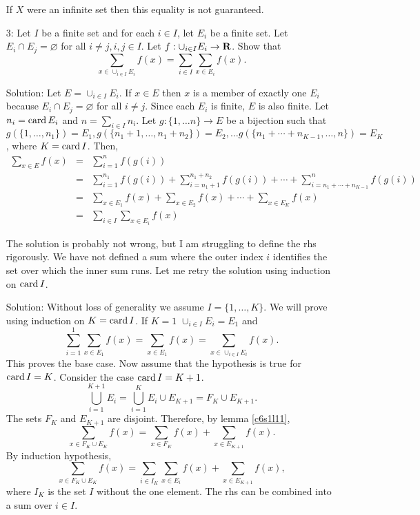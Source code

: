 \begin{enumerate}
\begin{rem}
If $X$ were an infinite set then this equality is not guaranteed.
\end{rem}

\item[3:] Let $I$ be a finite set and for each $i \in I$, let $E_i$ be a
finite set. Let $E_i \cap E_j = \varnothing$ for all $i \ne j, i, j \in I$.
Let $f: \cup_{i \in I}E_i \rightarrow \mathbf{R}$. Show that
\[
\sum_{x \in \cup_{i \in I} E_i}f(x) = \sum_{i \in I}\sum_{x \in E_i} f(x).
\]
\item[Solution:] Let $E = \cup_{i \in I}E_i$. If $x \in E$ then $x$ is a
member of exactly one $E_i$ because $E_i \cap E_j = \varnothing$ for all
$i \ne j$. Since each $E_i$ is finite, $E$ is also finite. Let $n_i = \operatorname{card}
E_i$ and $n = \sum_{i \in I}n_i$. Let $g: \{1, \ldots n\} \rightarrow E$ be
a bijection such that $g(\{1, \ldots, n_1\}) = E_1, g(\{n_1 + 1, \ldots,
n_1 + n_2\}) = E_2, \ldots g(\{n_1 + \cdots + n_{K-1}, \ldots, n\}) = E_K$,
where $K = \operatorname{card} I$. Then,
\begin{eqnarray*}
\sum_{x \in E} f(x) &=& \sum_{i=1}^n f(g(i)) \\
 &=& \sum_{i=1}^{n_1} f(g(i)) + \sum_{i=n_1+1}^{n_1+n_2} f(g(i)) + \cdots
    + \sum_{i=n_1 + \cdots + n_{K-1}}^n f(g(i)) \\
 &=& \sum_{x \in E_1} f(x) + \sum_{x \in E_2}f(x) + \cdots + 
     \sum_{x \in E_K} f(x) \\
 &=& \sum_{i \in I} \sum_{x \in E_i} f(x)
\end{eqnarray*}

\begin{rem}
The solution is probably not wrong, but I am struggling to define the rhs
rigorously. We have not defined a sum where the outer index $i$ identifies
the set over which the inner sum runs. Let me retry the solution using 
induction on $\operatorname{card} I$.
\end{rem}

\item[Solution:] Without loss of generality we assume $I = \{1, \ldots, K\}$.
We will prove using induction on $K = \operatorname{card} I$. If $K = 1$
$\cup_{i \in I}E_i = E_1$ and 
\[
\sum_{i=1}^1 \sum_{x \in E_1}f(x) = \sum_{x \in E_1}f(x) = \sum_{x \in 
\cup_{i \in I}E_i} f(x).
\]
This proves the base case. Now assume that the hypothesis is true for 
$\operatorname{card} I = K$. Consider the case $\operatorname{card} I = K + 1$. 
\[
\bigcup_{i=1}^{K + 1} E_i = \bigcup_{i=1}^K E_i \cup E_{K+1} = F_K \cup
E_{K+1}.
\]
The sets $F_K$ and $E_{K+1}$ are disjoint. Therefore, by lemma \ref{c6s1l11},
\[
\sum_{x \in F_K \cup E_K} f(x) = \sum_{x \in F_K}f(x) + \sum_{x \in E_{K+1}}
f(x).
\]
By induction hypothesis,
\[
\sum_{x \in F_K \cup E_K} f(x) = \sum_{i \in I_K}\sum_{x \in E_i}f(x) + 
\sum_{x \in E_{K+1}} f(x),
\]
where $I_K$ is the set $I$ without the one element. The rhs can be combined
into a sum over $i \in I$.
\end{enumerate}

